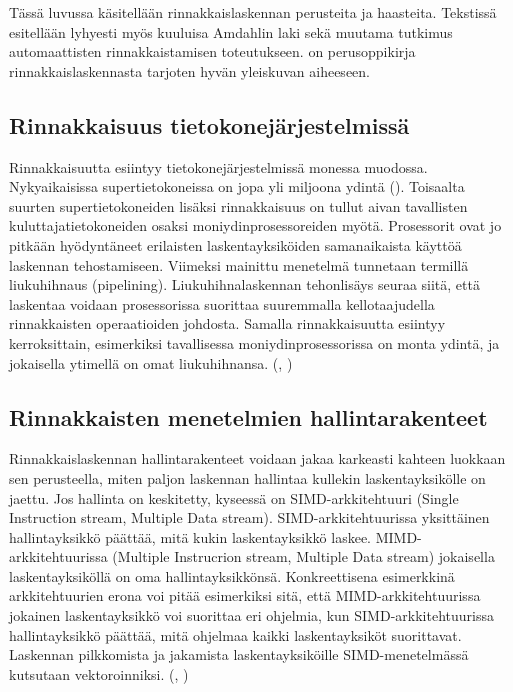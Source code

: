 Tässä luvussa käsitellään rinnakkaislaskennan perusteita ja haasteita.
Tekstissä esitellään lyhyesti
myös kuuluisa Amdahlin laki sekä muutama tutkimus automaattisten
rinnakkaistamisen toteutukseen. \citealt{intro} on perusoppikirja
rinnakkaislaskennasta tarjoten hyvän yleiskuvan aiheeseen.

\subsection{Rinnakkaisuus tietokonejärjestelmissä}

Rinnakkaisuutta esiintyy tietokonejärjestelmissä monessa muodossa.
Nykyaikaisissa supertietokoneissa on jopa yli miljoona ydintä (\citealt{top500}).
Toisaalta suurten supertietokoneiden lisäksi rinnakkaisuus on tullut aivan tavallisten
kuluttajatietokoneiden osaksi moniydinprosessoreiden myötä. Prosessorit ovat jo pitkään hyödyntäneet
erilaisten laskentayksiköiden samanaikaista käyttöä laskennan tehostamiseen.
Viimeksi mainittu menetelmä tunnetaan termillä liukuhihnaus (pipelining).
Liukuhihnalaskennan tehonlisäys seuraa siitä, että laskentaa voidaan
prosessorissa suorittaa suuremmalla kellotaajudella rinnakkaisten operaatioiden
johdosta. Samalla rinnakkaisuutta esiintyy kerroksittain, esimerkiksi
tavallisessa moniydinprosessorissa on monta ydintä, ja jokaisella ytimellä on
omat liukuhihnansa. (\citealt{intro}, \citealt{rauber})

\subsection{Rinnakkaisten menetelmien hallintarakenteet}

Rinnakkaislaskennan hallintarakenteet voidaan jakaa karkeasti kahteen luokkaan sen perusteella,
miten paljon laskennan hallintaa kullekin laskentayksikölle on jaettu. Jos
hallinta on keskitetty, kyseessä on SIMD-arkkitehtuuri (Single Instruction
stream, Multiple Data stream). SIMD-arkkitehtuurissa yksittäinen
hallintayksikkö päättää, mitä kukin laskentayksikkö laskee.
MIMD-arkkitehtuurissa (Multiple Instrucrion stream, Multiple Data stream)
jokaisella laskentayksiköllä on oma hallintayksikkönsä. Konkreettisena
esimerkkinä arkkitehtuurien erona voi pitää esimerkiksi sitä, että
MIMD-arkkitehtuurissa jokainen laskentayksikkö voi suorittaa eri ohjelmia, kun
SIMD-arkkitehtuurissa hallintayksikkö päättää, mitä ohjelmaa kaikki
laskentayksiköt suorittavat. Laskennan pilkkomista ja jakamista
laskentayksiköille SIMD-menetelmässä kutsutaan vektoroinniksi. (\citealt{intro}, \citealt{rauber})

